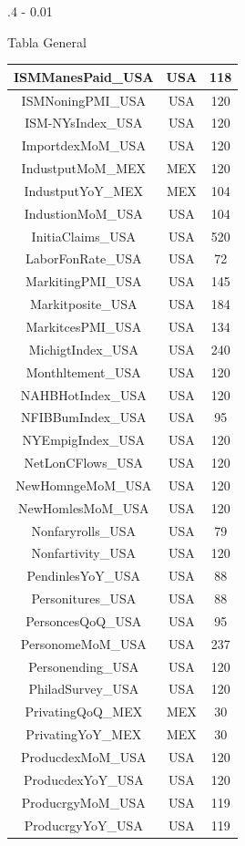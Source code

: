 \documentclass{iteraposter}\usepackage[]{graphicx}\usepackage[]{color}
\begin{document}
\begin{frame}
\begin{columns}[onlytextwidth]
\begin{column}{.4 \textwidth - 0.01\textwidth}
\begin{block}{Tabla General}
\begin{tabular}{c|c|c}
ISMManesPaid\_USA & USA & 118\\
\hline
ISMNoningPMI\_USA & USA & 120\\
\hline
ISM-NYsIndex\_USA & USA & 120\\
\hline
ImportdexMoM\_USA & USA & 120\\
\hline
IndustputMoM\_MEX & MEX & 120\\
\hline
IndustputYoY\_MEX & MEX & 104\\
\hline
IndustionMoM\_USA & USA & 104\\
\hline
InitiaClaims\_USA & USA & 520\\
\hline
LaborFonRate\_USA & USA & 72\\
\hline
MarkitingPMI\_USA & USA & 145\\
\hline
Markitposite\_USA & USA & 184\\
\hline
MarkitcesPMI\_USA & USA & 134\\
\hline
MichigtIndex\_USA & USA & 240\\
\hline
Monthltement\_USA & USA & 120\\
\hline
NAHBHotIndex\_USA & USA & 120\\
\hline
NFIBBumIndex\_USA & USA & 95\\
\hline
NYEmpigIndex\_USA & USA & 120\\
\hline
NetLonCFlows\_USA & USA & 120\\
\hline
NewHomngeMoM\_USA & USA & 120\\
\hline
NewHomlesMoM\_USA & USA & 120\\
\hline
Nonfaryrolls\_USA & USA & 79\\
\hline
Nonfartivity\_USA & USA & 120\\
\hline
PendinlesYoY\_USA & USA & 88\\
\hline
Personitures\_USA & USA & 88\\
\hline
PersoncesQoQ\_USA & USA & 95\\
\hline
PersonomeMoM\_USA & USA & 237\\
\hline
Personending\_USA & USA & 120\\
\hline
PhiladSurvey\_USA & USA & 120\\
\hline
PrivatingQoQ\_MEX & MEX & 30\\
\hline
PrivatingYoY\_MEX & MEX & 30\\
\hline
ProducdexMoM\_USA & USA & 120\\
\hline
ProducdexYoY\_USA & USA & 120\\
\hline
ProducrgyMoM\_USA & USA & 119\\
\hline
ProducrgyYoY\_USA & USA & 119\\

\end{tabular}
\end{block}
\end{column}
\end{columns}
\end{frame}
\end{document}

